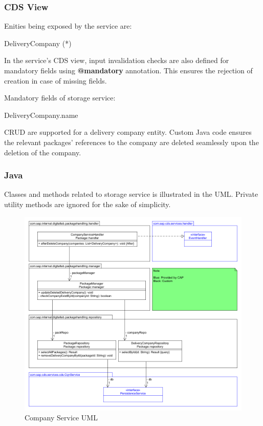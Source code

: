 \subsubsection{CDS View}

Enities being exposed by the service are:
\begin{compactenum}
	\item DeliveryCompany (*)
\end{compactenum}

\bigskip
In the service's CDS view, input invalidation checks are also defined for mandatory fields using \textbf{@mandatory} annotation. This ensures the rejection of creation in case of missing fields. 

\bigskip
Mandatory fields of storage service:
\begin{compactenum}
	\item DeliveryCompany.name
\end{compactenum}

\bigskip
CRUD are supported for a delivery company entity. Custom Java code ensures the relevant packages' references to the company are deleted seamlessly upon the deletion of the company.

\subsubsection{Java}

Classes and methods related to storage service is illustrated in the UML. Private utility methods are ignored for the sake of simplicity.
\begin{figure}[!h]
    \centering
    \includegraphics[width=1\linewidth]{images/service_class_diagrams/company_service_class_diagram.png}
    \caption{Company Service UML}
    \label{fig:company_service_uml}
\end{figure}
\pagebreak

